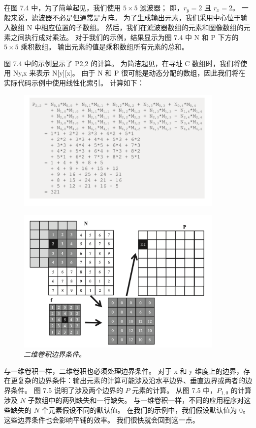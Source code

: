 在图 7.4 中，为了简单起见，我们使用 $5 \times 5$ 滤波器； 即，$r_y = 2$ 且 $r_x = 2$。
一般来说，滤波器不必是但通常是方阵。 为了生成输出元素，我们采用中心位于输入数组 N 中相应位置的子数组。
然后，我们在滤波器数组的元素和图像数组的元素之间执行成对乘法。 
对于我们的示例，结果显示为图 7.4 中 N 和 P 下方的 $5 \times 5$ 乘积数组。 输出元素的值是乘积数组所有元素的总和。

图 7.4 中的示例显示了 P2,2 的计算。 为简洁起见，在寻址 C 数组时，我们将使用 Ny,x 来表示 N[y][x]。 
由于 N 和 P 很可能是动态分配的数组，因此我们将在实际代码示例中使用线性化索引。 计算如下：

\begin{figure}[H]
	\centering
	\includegraphics[width=0.9\textwidth]{figs/F7-a1.png}
\end{figure}

\begin{figure}[H]
	\centering
	\includegraphics[width=0.9\textwidth]{figs/F7.5.png}
	\caption{\textit{二维卷积边界条件。}}
\end{figure}

与一维卷积一样，二维卷积也必须处理边界条件。 
对于 x 和 y 维度上的边界，存在更复杂的边界条件：输出元素的计算可能涉及沿水平边界、垂直边界或两者的边界条件。 
图 7.5 说明了涉及两个边界的 $P$ 元素的计算。 从图 7.5 中，$P_{1,0}$ 的计算涉及 $N$ 子数组中的两列缺失和一行缺失。
与一维卷积一样，不同的应用程序对这些缺失的 $N$ 个元素假设不同的默认值。 
在我们的示例中，我们假设默认值为 0。这些边界条件也会影响平铺的效率。 我们很快就会回到这一点。


